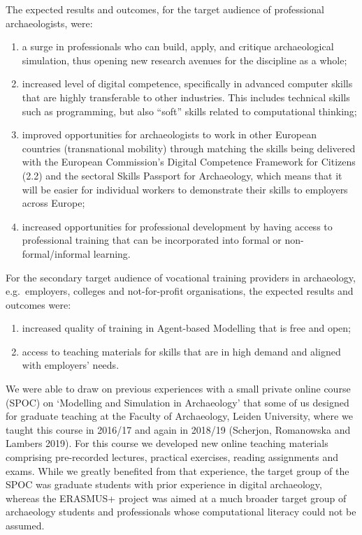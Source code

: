 \documentclass[
]{article}
\begin{document}
The expected results and outcomes, for the target audience of professional archaeologists, were:

\begin{enumerate}
\def\labelenumi{\arabic{enumi}.}
\item
  a surge in professionals who can build, apply, and critique archaeological simulation, thus opening new research avenues for the discipline as a whole;
\item
  increased level of digital competence, specifically in advanced computer skills that are highly transferable to other industries. This includes technical skills such as programming, but also ``soft'' skills related to computational thinking;
\item
  improved opportunities for archaeologists to work in other European countries (transnational mobility) through matching the skills being delivered with the European Commission's Digital Competence Framework for Citizens (2.2) and the sectoral Skills Passport for Archaeology, which means that it will be easier for individual workers to demonstrate their skills to employers across Europe;
\item
  increased opportunities for professional development by having access to professional training that can be incorporated into formal or non-formal/informal learning.
\end{enumerate}

For the secondary target audience of vocational training providers in archaeology, e.g.~employers, colleges and not-for-profit organisations, the expected results and outcomes were:

\begin{enumerate}
\def\labelenumi{\arabic{enumi}.}
\item
  increased quality of training in Agent-based Modelling that is free and open;
\item
  access to teaching materials for skills that are in high demand and aligned with employers' needs.
\end{enumerate}

We were able to draw on previous experiences with a small private online course (SPOC) on `Modelling and Simulation in Archaeology' that some of us designed for graduate teaching at the Faculty of Archaeology, Leiden University, where we taught this course in 2016/17 and again in 2018/19 (Scherjon, Romanowska and Lambers 2019). For this course we developed new online teaching materials comprising pre-recorded lectures, practical exercises, reading assignments and exams. While we greatly benefited from that experience, the target group of the SPOC was graduate students with prior experience in digital archaeology, whereas the ERASMUS+ project was aimed at a much broader target group of archaeology students and professionals whose computational literacy could not be assumed.
\end{document}
